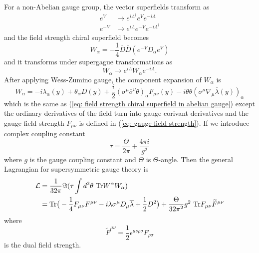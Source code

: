 \documentclass[12pt]{report}
\begin{document}
For a non-Abelian gauge group, the vector superfields transform as
\begin{align}
e^{V} &\to e^{i \Lambda^{\dag}} e^{V} e^{-i \Lambda}\\
e^{-V} & \to e^{i \Lambda} e^{-V} e^{-i \Lambda^{\dag}}
\end{align}
and the field strength chiral superfield becomes
\begin{equation}
W_{\alpha} = -\frac{1}{4} \overline{D} \overline{D} (e^{-V} D_{\alpha} e^{V})
\end{equation}
and it transforms under supergague transformations as
\begin{equation}
W_{\alpha} \to e^{i \Lambda} W_{\alpha} e^{-i \Lambda}.
\end{equation}
After applying Wess-Zumino gauge, the component expansion of $W_{\alpha}$ is
\begin{equation}
W_{\alpha} = -i \lambda_{\alpha} (y) + \theta_{\alpha} D(y) + \frac{i}{2} (\sigma^{\mu} \overline{\sigma}^{\nu} \theta)_{\alpha} F_{\mu \nu} (y) - i \theta \theta (\sigma^{\mu} \nabla_{\mu} \overline{\lambda} (y))_{\alpha}
\end{equation}
which is the same as (\ref{eq: field strength chiral superfield in abelian gauge}) except the ordinary derivatives of the field turn into gauge corivant derivatives and the gauge field strength $F_{\mu \nu}$ is defined in (\ref{eq: gauge field strength}).
If we introduce complex coupling constant
\begin{equation}
\tau = \frac{\Theta}{2 \pi} + \frac{4 \pi i}{g^{2}}
\end{equation}
where $g$ is the gauge coupling constant and $\Theta$ is $\Theta$-angle.
Then the general Lagrangian for supersymmetric gauge theory is
\begin{align}
\mathcal{L} &= \frac{1}{32 \pi} \Im (\tau \int d^{2} \theta \ \mathrm{Tr} W^{\alpha} W_{\alpha}) \notag\\
&= \mathrm{Tr} \big( -\frac{1}{4} F_{\mu \nu} F^{\mu \nu} -i \lambda \sigma^{\mu} D_{\mu} \overline{\lambda} + \frac{1}{2} D^{2} \big)
+ \frac{\Theta}{32 \pi^{2}} g^{2} \ \mathrm{Tr} F_{\mu \nu} \widetilde{F}^{\mu \nu}
\end{align}
where
\begin{equation}
\widetilde{F}^{\mu \nu} = \frac{1}{2} \epsilon^{\mu \nu \rho \sigma} F_{\rho \sigma}
\end{equation}
is the dual field strength.
\end{document}
